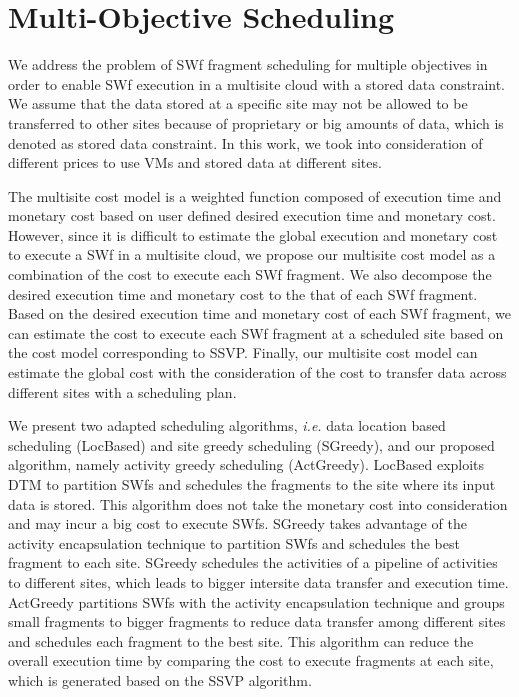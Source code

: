 \section*{Multi-Objective Scheduling}

We address the problem of SWf fragment scheduling for multiple objectives in order to enable SWf execution in a multisite cloud with a stored data constraint. We assume that the data stored at a specific site may not be allowed to be transferred to other sites because of proprietary or big amounts of data, which is denoted as stored data constraint. In this work, we took into consideration of different prices to use VMs and stored data at different sites.

The multisite cost model is a weighted function composed of execution time and monetary cost based on user defined desired execution time and monetary cost. However, since it is difficult to estimate the global execution and monetary cost to execute a SWf in a multisite cloud, we propose our multisite cost model as a combination of the cost to execute each SWf fragment. We also decompose the desired execution time and monetary cost to the that of each SWf fragment. Based on the desired execution time and monetary cost of each SWf fragment, we can estimate the cost to execute each SWf fragment at a scheduled site based on the cost model corresponding to SSVP. Finally, our multisite cost model can estimate the global cost with the consideration of the cost to transfer data across different sites with a scheduling plan.

We present two adapted scheduling algorithms, \textit{i.e.} data location based scheduling (LocBased) and site greedy scheduling (SGreedy), and our proposed algorithm, namely activity greedy scheduling (ActGreedy). LocBased exploits DTM to partition SWfs and schedules the fragments to the site where its input data is stored. This algorithm does not take the monetary cost into consideration and may incur a big cost to execute SWfs. SGreedy takes advantage of the activity encapsulation technique to partition SWfs and schedules the best fragment to each site. SGreedy schedules the activities of a pipeline of activities to different sites, which leads to bigger intersite data transfer and execution time. ActGreedy partitions SWfs with the activity encapsulation technique and groups small fragments to bigger fragments to reduce data transfer among different sites and schedules each fragment to the best site. This algorithm can reduce the overall execution time by comparing the cost to execute fragments at each site, which is generated based on the SSVP algorithm. 

